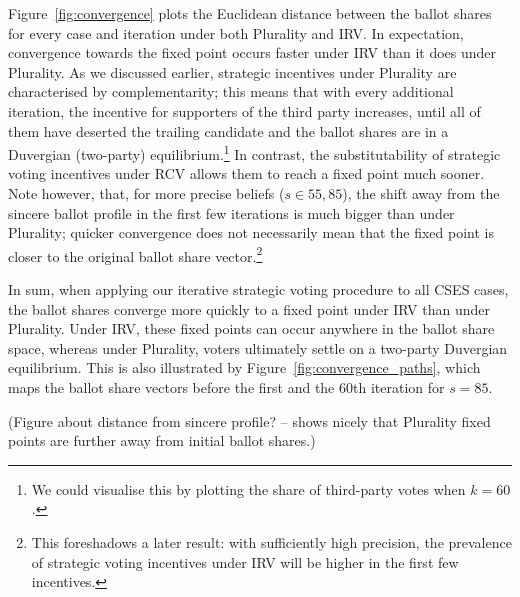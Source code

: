 \documentclass[11pt,a4paper]{article}
\begin{document}
Figure~\ref{fig:convergence} plots the Euclidean distance between the ballot shares for every case and iteration under both Plurality and IRV. In expectation, convergence towards the fixed point occurs faster under IRV than it does under Plurality. As we discussed earlier, strategic incentives under Plurality are characterised by complementarity; this means that with every additional iteration, the incentive for supporters of the third party increases, until all of them have deserted the trailing candidate and the ballot shares are in a Duvergian (two-party) equilibrium.\footnote{We could visualise this by plotting the share of third-party votes when $k = 60$.} In contrast, the substitutability of strategic voting incentives under RCV allows them to reach a fixed point much sooner. Note however, that, for more precise beliefs ($s \in {55, 85}$), the shift away from the sincere ballot profile in the first few iterations is much bigger than under Plurality; quicker convergence does not necessarily mean that the fixed point is closer to the original ballot share vector.\footnote{This foreshadows a later result: with sufficiently high precision, the prevalence of strategic voting incentives under IRV will be higher in the first few incentives.}

In sum, when applying our iterative strategic voting procedure to all CSES cases, the ballot shares converge more quickly to a fixed point under IRV than under Plurality. Under IRV, these fixed points can occur anywhere in the ballot share space, whereas under Plurality, voters ultimately settle on a two-party Duvergian equilibrium. This is also illustrated by Figure~\ref{fig:convergence_paths}, which maps the ballot share vectors before the first and the 60th iteration for $s = 85$.

(Figure about distance from sincere profile? -- shows nicely that Plurality fixed points are further away from initial ballot shares.)
\end{document}
